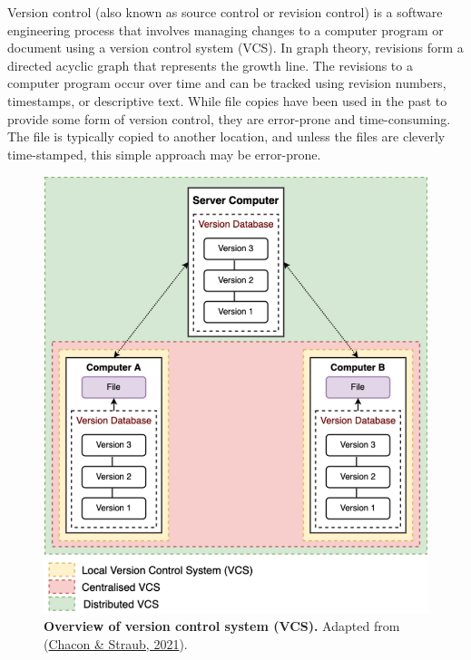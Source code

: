 \documentclass[12pt,twoside]{reedthesis}
\begin{document}
Version control (also known as source control or revision control) is a
software engineering process that involves managing changes to a
computer program or document using a version control system (VCS). In
graph theory, revisions form a directed acyclic graph that represents
the growth line. The revisions to a computer program occur over time and
can be tracked using revision numbers, timestamps, or descriptive text.
While file copies have been used in the past to provide some form of
version control, they are error-prone and time-consuming. The file is
typically copied to another location, and unless the files are cleverly
time-stamped, this simple approach may be error-prone.



\begin{figure}[htbp]

{\centering \includegraphics{thesis_files/figure-latex/mf1-1} 

}

\caption[Overview of version control system]{\textbf{Overview of version control system (VCS).} Adapted
from (\protect\hyperlink{ref-chacon2021}{Chacon \& Straub, 2021}).}\label{fig:mf1}
\end{figure}
\end{document}
